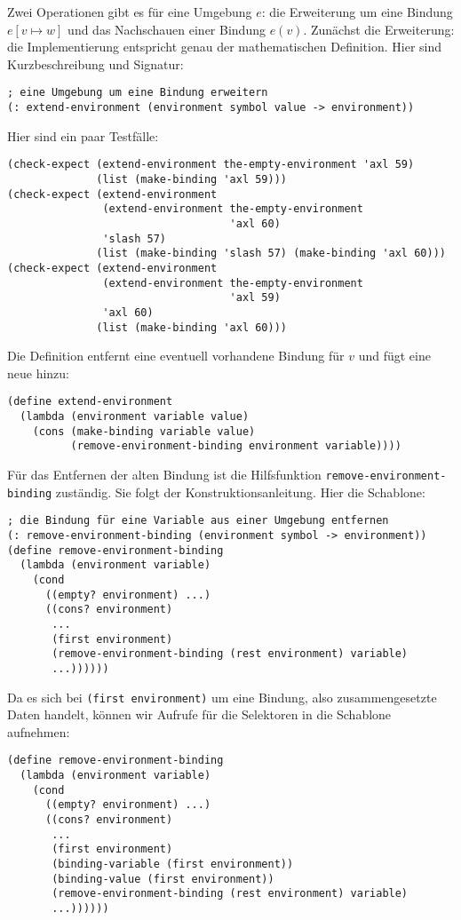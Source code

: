 Zwei Operationen gibt es für eine Umgebung $e$: die Erweiterung um
eine Bindung $e[v\mapsto w]$ und das Nachschauen einer Bindung $e(v)$.
Zunächst die Erweiterung: die Implementierung entspricht genau der
mathematischen Definition.  Hier sind Kurzbeschreibung und Signatur:
% 
\begin{lstlisting}
; eine Umgebung um eine Bindung erweitern
(: extend-environment (environment symbol value -> environment))
\end{lstlisting}
%
Hier sind ein paar Testfälle:
%
\begin{lstlisting}
(check-expect (extend-environment the-empty-environment 'axl 59)
              (list (make-binding 'axl 59)))
(check-expect (extend-environment
               (extend-environment the-empty-environment
                                   'axl 60)
               'slash 57)
              (list (make-binding 'slash 57) (make-binding 'axl 60)))
(check-expect (extend-environment
               (extend-environment the-empty-environment
                                   'axl 59)
               'axl 60)
              (list (make-binding 'axl 60)))
\end{lstlisting}
%
Die Definition entfernt eine eventuell vorhandene Bindung
für $v$ und fügt eine neue hinzu:
%
\begin{lstlisting}
(define extend-environment
  (lambda (environment variable value)
    (cons (make-binding variable value)
          (remove-environment-binding environment variable))))
\end{lstlisting}
%
Für das Entfernen der alten Bindung ist die Hilfsfunktion
\lstinline{remove-environment-binding} zuständig.  Sie folgt der
Konstruktionsanleitung.  Hier die Schablone:
%
\begin{lstlisting}
; die Bindung für eine Variable aus einer Umgebung entfernen
(: remove-environment-binding (environment symbol -> environment))
(define remove-environment-binding
  (lambda (environment variable)
    (cond
      ((empty? environment) ...)
      ((cons? environment)
       ...
       (first environment)
       (remove-environment-binding (rest environment) variable)
       ...))))))
\end{lstlisting}
%
Da es sich bei \lstinline{(first environment)} um eine Bindung, also
zusammengesetzte Daten handelt, können wir Aufrufe für die Selektoren
in die Schablone aufnehmen:
%
\begin{lstlisting}
(define remove-environment-binding
  (lambda (environment variable)
    (cond
      ((empty? environment) ...)
      ((cons? environment)
       ...
       (first environment)
       (binding-variable (first environment))
       (binding-value (first environment))
       (remove-environment-binding (rest environment) variable)
       ...))))))
\end{lstlisting}
